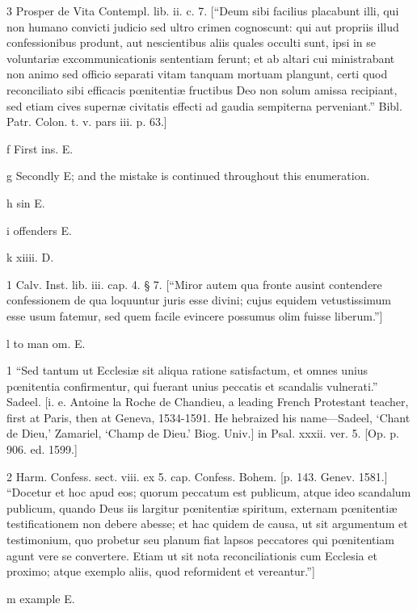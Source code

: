 3
Prosper de Vita Contempl. lib. ii. c. 7. [“Deum sibi facilius placabunt illi, qui non humano convicti judicio sed ultro crimen cognoscunt: qui aut propriis illud confessionibus produnt, aut nescientibus aliis quales occulti sunt, ipsi in se voluntariæ excommunicationis sententiam ferunt; et ab altari cui ministrabant non animo sed officio separati vitam tanquam mortuam plangunt, certi quod reconciliato sibi efficacis pœnitentiæ fructibus Deo non solum amissa recipiant, sed etiam cives supernæ civitatis effecti ad gaudia sempiterna perveniant.” Bibl. Patr. Colon. t. v. pars iii. p. 63.]

f
First ins. E.

g
Secondly E; and the mistake is continued throughout this enumeration.

h
sin E.

i
offenders E.

k
xiiii. D.

1
Calv. Inst. lib. iii. cap. 4. § 7. [“Miror autem qua fronte ausint contendere confessionem de qua loquuntur juris esse divini; cujus equidem vetustissimum esse usum fatemur, sed quem facile evincere possumus olim fuisse liberum.”]

l
to man om. E.

1
“Sed tantum ut Ecclesiæ sit aliqua ratione satisfactum, et omnes unius pœnitentia confirmentur, qui fuerant unius peccatis et scandalis vulnerati.” Sadeel. [i. e. Antoine la Roche de Chandieu, a leading French Protestant teacher, first at Paris, then at Geneva, 1534-1591. He hebraized his name—Sadeel, ‘Chant de Dieu,’ Zamariel, ‘Champ de Dieu.’ Biog. Univ.] in Psal. xxxii. ver. 5. [Op. p. 906. ed. 1599.]

2
Harm. Confess. sect. viii. ex 5. cap. Confess. Bohem. [p. 143. Genev. 1581.] “Docetur et hoc apud eos; quorum peccatum est publicum, atque ideo scandalum publicum, quando Deus iis largitur pœnitentiæ spiritum, externam pœnitentiæ testificationem non debere abesse; et hac quidem de causa, ut sit argumentum et testimonium, quo probetur seu planum fiat lapsos peccatores qui pœnitentiam agunt vere se convertere. Etiam ut sit nota reconciliationis cum Ecclesia et proximo; atque exemplo aliis, quod reformident et vereantur.”]

m
example E.

